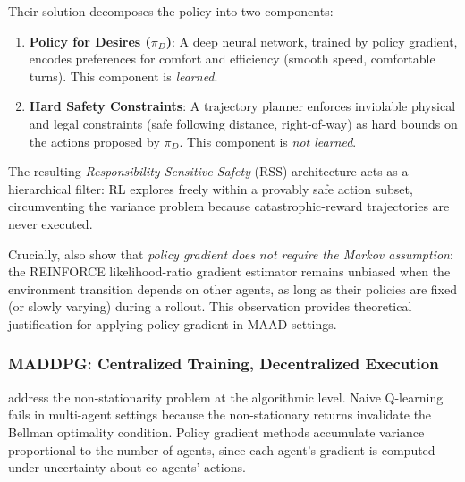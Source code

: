\documentclass[12pt, a4paper]{article}
\begin{document}
Their solution decomposes the policy into two components:
\begin{enumerate}[noitemsep]
  \item \textbf{Policy for Desires ($\pi_D$)}: A deep neural network, trained by
        policy gradient, encodes preferences for comfort and efficiency (smooth
        speed, comfortable turns). This component is \emph{learned}.
  \item \textbf{Hard Safety Constraints}: A trajectory planner enforces inviolable
        physical and legal constraints (safe following distance, right-of-way) as
        hard bounds on the actions proposed by $\pi_D$. This component is
        \emph{not learned}.
\end{enumerate}
The resulting \emph{Responsibility-Sensitive Safety} (RSS) architecture acts as a
hierarchical filter: RL explores freely within a provably safe action subset,
circumventing the variance problem because catastrophic-reward trajectories are
never executed.

Crucially, \citet{shalev2016safe} also show that \emph{policy gradient does not
require the Markov assumption}: the REINFORCE likelihood-ratio gradient estimator
remains unbiased when the environment transition depends on other agents, as long
as their policies are fixed (or slowly varying) during a rollout. This observation
provides theoretical justification for applying policy gradient in MAAD settings.

\subsubsection{MADDPG: Centralized Training, Decentralized Execution}
\label{sec:maddpg}

\citet{lowe2017multi} address the non-stationarity problem at the algorithmic level.
Naive Q-learning fails in multi-agent settings because the non-stationary returns
invalidate the Bellman optimality condition. Policy gradient methods accumulate
variance proportional to the number of agents, since each agent's gradient is
computed under uncertainty about co-agents' actions.
\end{document}
